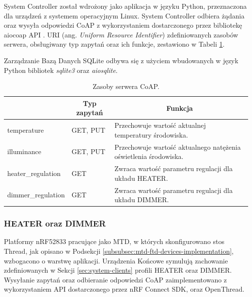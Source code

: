            System Controller został wdrożony jako aplikacja w języku Python, przeznaczona dla urządzeń z systemem operacyjnym Linux.
            System Controller odbiera żądania oraz wysyła odpowiedzi CoAP z wykorzystaniem dostarczonego przez bibliotekę aiocoap API \cite{aiocoap}. URI (ang. \textit{Uniform Resource Identifier}) zdefiniowanych zasobów serwera, obsługiwany typ zapytań oraz ich funkcje, zestawiono w Tabeli \ref{tab:resurces}.
            
            Zarządzanie Bazą Danych SQLite odbywa się z użyciem wbudowanych w język Python bibliotek \textit{sqlite3} oraz \textit{aiosqlite}.

            \begin{table}[H]
                \centering
                \caption{Zasoby serwera CoAP.}
                \begin{tabular}{|l|l|l|}
                     \hline
                     \rowcolor{gray!20}
                     \multicolumn{1}{|c|}{Zasób} & \multicolumn{1}{c|}{Typ zapytań} & \multicolumn{1}{c|}{Funkcja} \\
                     \hline
                     temperature & GET, PUT & Przechowuje wartość aktualnej temperatury środowiska.\\
                     \hline
                     illuminance & GET, PUT & Przechowuje wartość aktualnego natężenia oświetlenia środowiska.\\
                     \hline
                     heater\_regulation & GET & Zwraca wartość parametru regulacji dla układu HEATER.\\
                     \hline
                     dimmer\_regulation & GET & Zwraca wartość parametru regulacji dla układu DIMMER.\\
                     \hline
                \end{tabular}
                \label{tab:resurces}
            \end{table}
    
        \subsubsection{HEATER oraz DIMMER}

            Platformy nRF52833 pracujące jako MTD, w których skonfigurowano stos Thread, jak opisano w Podsekcji \ref{subsubsec:mtd-ftd-devices-implementation}, wzbogacono o warstwę aplikacji. Urządzenia Końcowe symulują zachowanie zdefiniowanych w Sekcji \ref{sec:system-clients} profili HEATER oraz DIMMER. Wysyłanie zapytań oraz odbieranie odpowiedzi CoAP zaimplementowano z wykorzystaniem API dostarczonego przez nRF Connect SDK, oraz OpenThread.

